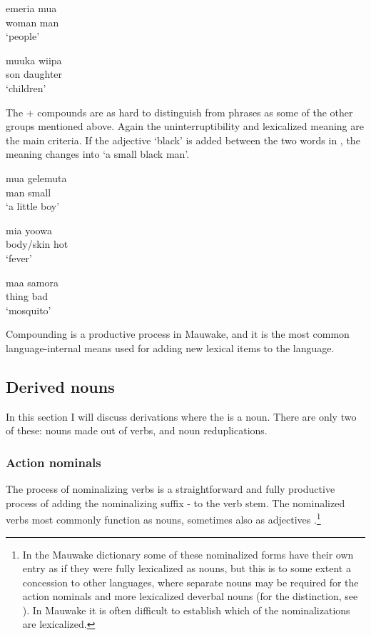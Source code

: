 \ea%
\label{ex:3:x50}
\gll emeria mua \\
woman man\\
\glt`people'
\z

\ea%
\label{ex:3:x51}
\gll muuka wiipa \\
son daughter\\
\glt`children'
\z

The + compounds are as hard to distinguish from phrases as some of the other groups mentioned above. Again the uninterruptibility and lexicalized meaning are the main criteria. If the adjective  `black' is added between the two words in , the meaning changes into `a small black man'.

\ea%
\label{ex:3:x57}
\gll mua gelemuta \\
man small\\
\glt`a little boy'
\z

\ea%
\label{ex:3:x58}
\gll mia yoowa \\
body/skin hot\\
\glt`fever'
\z

\ea%
\label{ex:3:x59}
\gll maa samora \\
thing bad\\
\glt`mosquito'
\z

Compounding is a productive process in Mauwake, and it is the most common language-internal means used for adding new lexical items to the language. 

\subsection{Derived nouns}\label{sec:3:2:6}
{}
In this section I will discuss derivations where the  is a noun. There are only two of these: nouns made out of verbs, and noun reduplications. 

\subsubsection{Action nominals}\label{sec:3:z:y:x}
{}
The process of nominalizing verbs is a straightforward and fully productive process of adding the nominalizing suffix - to the verb stem. The nominalized verbs most commonly function as nouns, sometimes also as adjectives .\footnote{In the Mauwake dictionary some of these nominalized forms have their own entry as if they were fully lexicalized as nouns, but this is to some extent a concession to other languages, where separate nouns may be required for the action nominals and more lexicalized deverbal nouns (for the distinction, see \citealt[193]{Ylikoski2003}). In Mauwake it is often difficult to establish which of the nominalizations are lexicalized.}

